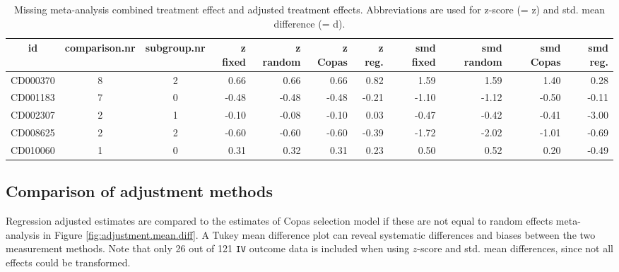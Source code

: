 \documentclass[11pt,a4paper,twoside]{book}\usepackage[]{graphicx}\usepackage[]{color}
\begin{document}
\begin{table}[ht]
\centering
\begingroup\tiny
\begin{tabular}{cccrrrrrrrr}
  \hline
id & comparison.nr & subgroup.nr & z fixed & z random & z Copas & z reg. & smd fixed & smd random & smd Copas & smd reg. \\ 
  \hline
CD000370 & 8 & 2 & 0.66 & 0.66 & 0.66 & 0.82 & 1.59 & 1.59 & 1.40 & 0.28 \\ 
  CD001183 & 7 & 0 & -0.48 & -0.48 & -0.48 & -0.21 & -1.10 & -1.12 & -0.50 & -0.11 \\ 
  CD002307 & 2 & 1 & -0.10 & -0.08 & -0.10 & 0.03 & -0.47 & -0.42 & -0.41 & -3.00 \\ 
  CD008625 & 2 & 2 & -0.60 & -0.60 & -0.60 & -0.39 & -1.72 & -2.02 & -1.01 & -0.69 \\ 
  CD010060 & 1 & 0 & 0.31 & 0.32 & 0.31 & 0.23 & 0.50 & 0.52 & 0.20 & -0.49 \\ 
   \hline
\end{tabular}
\endgroup
\caption{Missing meta-analysis combined treatment effect and adjusted treatment effects. Abbreviations are used for z-score (= z) and std. mean difference (= d).} 
\label{missing.differences}
\end{table}



\subsection{Comparison of adjustment methods}
Regression adjusted estimates are compared to the estimates of Copas selection model if these are not equal to random effects meta-analysis in Figure \ref{fig:adjustment.mean.diff}. A Tukey mean difference plot can reveal systematic differences and biases between the two measurement methods. Note that only 26 out of 121 \texttt{IV} outcome data is included when using $z$-score and std. mean differences, since not all effects could be transformed.
\end{document}
